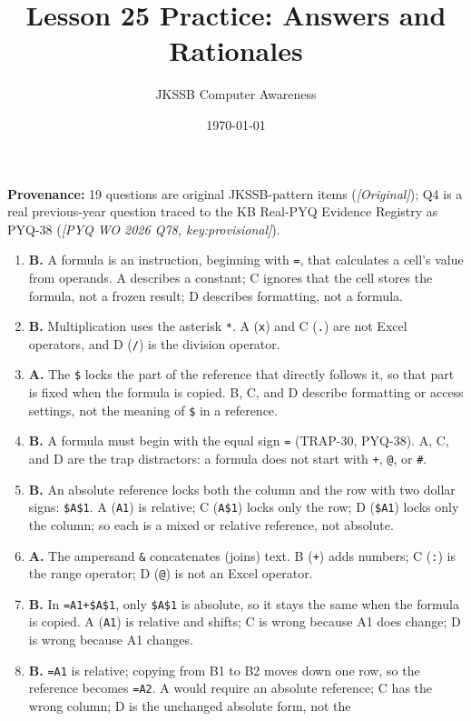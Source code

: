\documentclass[11pt]{article}
\title{Lesson 25 Practice: Answers and Rationales}
\author{JKSSB Computer Awareness}
\date{\today}
\begin{document}
\maketitle
\noindent\textbf{Provenance:} 19 questions are original JKSSB-pattern items
(\textit{[Original]}); Q4 is a real previous-year question traced to the KB
Real-PYQ Evidence Registry as PYQ-38
(\textit{[PYQ WO 2026 Q78, key:provisional]}).
\begin{enumerate}[label=\textbf{Q\arabic*.}, leftmargin=*]
\item \textbf{B.} A formula is an instruction, beginning with \texttt{=}, that
  calculates a cell's value from operands. A describes a constant; C ignores
  that the cell stores the formula, not a frozen result; D describes
  formatting, not a formula.
\item \textbf{B.} Multiplication uses the asterisk \texttt{*}. A (\texttt{x})
  and C (\texttt{.}) are not Excel operators, and D (\texttt{/}) is the
  division operator.
\item \textbf{A.} The \texttt{\$} locks the part of the reference that
  directly follows it, so that part is fixed when the formula is copied. B, C,
  and D describe formatting or access settings, not the meaning of \texttt{\$}
  in a reference.
\item \textbf{B.} A formula must begin with the equal sign \texttt{=} (TRAP-30,
  PYQ-38). A, C, and D are the trap distractors: a formula does not start with
  \texttt{+}, \texttt{@}, or \texttt{\#}.
\item \textbf{B.} An absolute reference locks both the column and the row with
  two dollar signs: \texttt{\$A\$1}. A (\texttt{A1}) is relative; C
  (\texttt{A\$1}) locks only the row; D (\texttt{\$A1}) locks only the column;
  so each is a mixed or relative reference, not absolute.
\item \textbf{A.} The ampersand \texttt{\&} concatenates (joins) text. B
  (\texttt{+}) adds numbers; C (\texttt{:}) is the range operator; D
  (\texttt{@}) is not an Excel operator.
\item \textbf{B.} In \texttt{=A1+\$A\$1}, only \texttt{\$A\$1} is absolute, so
  it stays the same when the formula is copied. A (\texttt{A1}) is relative
  and shifts; C is wrong because A1 does change; D is wrong because A1 changes.
\item \textbf{B.} \texttt{=A1} is relative; copying from B1 to B2 moves down
  one row, so the reference becomes \texttt{=A2}. A would require an absolute
  reference; C has the wrong column; D is the unchanged absolute form, not the

\end{enumerate}
\end{document}
